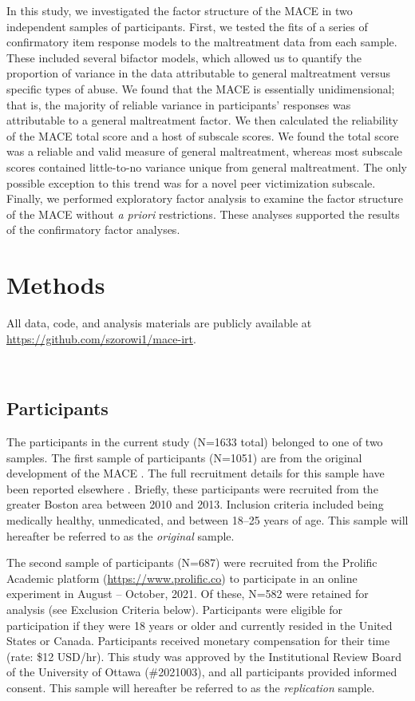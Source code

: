 \documentclass[letterpaper,man,natbib,noextraspace,floatsintext,longtable]{apa6}
\begin{document}
In this study, we investigated the factor structure of the MACE in two independent samples of participants. First, we tested the fits of a series of confirmatory item response models to the maltreatment data from each sample. These included several bifactor models, which allowed us to quantify the proportion of variance in the data attributable to general maltreatment versus specific types of abuse. We found that the MACE is essentially unidimensional; that is, the majority of reliable variance in participants' responses was attributable to a general maltreatment factor. We then calculated the reliability of the MACE total score and a host of subscale scores. We found the total score was a reliable and valid measure of general maltreatment, whereas most subscale scores contained little-to-no variance unique from general maltreatment. The only possible exception to this trend was for a novel peer victimization subscale. Finally, we performed exploratory factor analysis to examine the factor structure of the MACE without \textit{a priori} restrictions. These analyses supported the results of the confirmatory factor analyses. 

\section{Methods}

All data, code, and analysis materials are publicly available at \url{https://github.com/szorowi1/mace-irt}.

{\begin{spacing}{0.2} \hfill \\ \end{spacing}} \subsection{Participants}

The participants in the current study (N=1633 total) belonged to one of two samples. The first sample of participants (N=1051) are from the original development of the MACE \citep{teicher2015maltreatment}. The full recruitment details for this sample have been reported elsewhere \citep{teicher2015maltreatment}. Briefly, these participants were recruited from the greater Boston area between 2010 and 2013. Inclusion criteria included being medically healthy, unmedicated, and between 18–25 years of age. This sample will hereafter be referred to as the \textit{original} sample. 

The second sample of participants (N=687) were recruited from the Prolific Academic platform (\url{https://www.prolific.co}) to participate in an online experiment in August -- October, 2021. Of these, N=582 were retained for analysis (see Exclusion Criteria below). Participants were eligible for participation if they were 18 years or older and currently resided in the United States or Canada. Participants received monetary compensation for their time (rate: \$12 USD/hr). This study was approved by the Institutional Review Board of the University of Ottawa (\#2021003), and all participants provided informed consent. This sample will hereafter be referred to as the \textit{replication} sample. 
\end{document}
